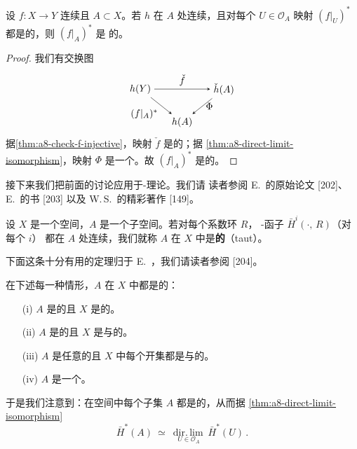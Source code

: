 \begin{corollary}\label{cor:a8-fa-injective}
设 $f\colon X\to Y$ 连续且 $A\subset X$。若 $h$ 在 $A$ 处连续，且对每个%
 $U\in\mathcal{O}_{A}$ 映射 $(f|_{U})^{*}$ 都是\trInjective{}的，则 $(f|_{A})^{*}$ 是%
\trInjective{}的。
\end{corollary}

\begin{proof}
我们有交换图
\[
\begin{tikzpicture}[>=stealth, baseline=(cY.base)]
\node (cY) at (0,0) {$h(Y)$};
\node (cA) at (3,0) {$\check{h}(A)$};
\node (cB) at (1.5,-1.2) {$h(A)$};
\draw[->] (cY) -- node[above]{$\check{f}$} (cA);
\draw[->] (cA) -- node[right]{$\Phi$} (cB);
\draw[->] (cY) -- node[below left]{$(f|_{A})^{*}$} (cB);
\end{tikzpicture}
\]
据\cref{thm:a8-check-f-injective}，映射 $\check{f}$ 是\trInjective{}的；据%
\cref{thm:a8-direct-limit-isomorphism}，映射 $\Phi$ 是一个\trIsomorphism。故%
 $(f|_{A})^{*}$ 是\trInjective{}的。
\end{proof}

接下来我们把前面的讨论应用于\trAlexander-\trSpanier{}\trCohomology{}理论。我们请%
读者参阅 E.~\trSpanier{}的原始论文 [202]、E.~\trSpanier{}的书 [203] 以及%
 W.\,S.~\trMassey{}的精彩著作 [149]。

\begin{definition}[{另见 [202]}]\label{def:a8-taut}
设 $X$ 是一个\trTopology{}空间，$A$ 是一个子空间。若对每个系数环 $R$，%
\trAlexander-\trSpanier{}\trCohomology{}函子 $\bar{H}^{i}(\cdot,\,R)$（对每个 $i$）%
都在 $A$ 处连续，我们就称 $A$ 在 $X$ 中是\textbf{\trTaut{}的}（taut）。
\end{definition}

下面这条十分有用的定理归于 E.~\trSpanier，我们请读者参阅 [204]。

\begin{theorem}\label{thm:a8-spanier-tautness}
在下述每一种情形，$A$ 在 $X$ 中都是\trTaut{}的：
\begin{enumerate}
\item[(i)] $A$ 是\trCompact{}的且 $X$ 是\trHausdorff{}的。
\item[(ii)] $A$ 是\trClosed{}的且 $X$ 是\trParacompact{}与\trHausdorff{}的。
\item[(iii)] $A$ 是任意的且 $X$ 中每个开集都是\trParacompact{}与\trHausdorff{}的。
\item[(iv)] $A$ 是一个\trNeighborhoodRetract。
\end{enumerate}
\end{theorem}

于是我们注意到：在\trMetrizable{}空间中每个子集 $A$ 都是\trTaut{}的，从而据%
\cref{thm:a8-direct-limit-isomorphism}
\[
\bar{H}^{*}(A)\ \simeq\ \operatorname*{dir.\,lim}_{\,U\in\mathcal{O}_{A}}\ \bar{H}^{*}(U)\,.
\]
